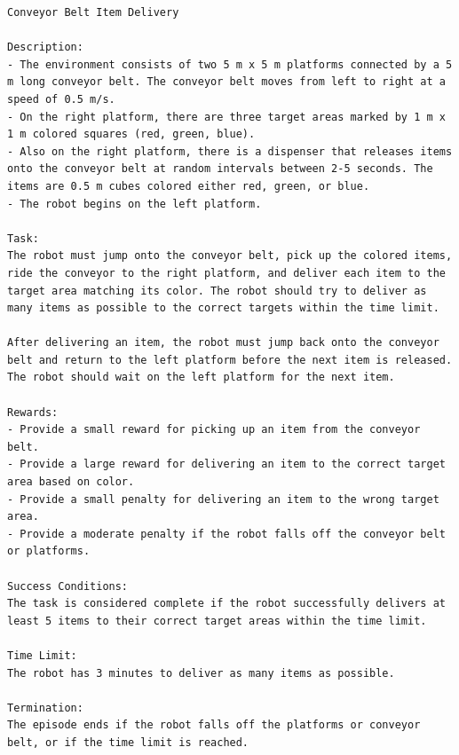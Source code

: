\begin{lstlisting}[language={}]
Conveyor Belt Item Delivery

Description:
- The environment consists of two 5 m x 5 m platforms connected by a 5 m long conveyor belt. The conveyor belt moves from left to right at a speed of 0.5 m/s.
- On the right platform, there are three target areas marked by 1 m x 1 m colored squares (red, green, blue). 
- Also on the right platform, there is a dispenser that releases items onto the conveyor belt at random intervals between 2-5 seconds. The items are 0.5 m cubes colored either red, green, or blue.
- The robot begins on the left platform. 

Task:
The robot must jump onto the conveyor belt, pick up the colored items, ride the conveyor to the right platform, and deliver each item to the target area matching its color. The robot should try to deliver as many items as possible to the correct targets within the time limit.

After delivering an item, the robot must jump back onto the conveyor belt and return to the left platform before the next item is released. The robot should wait on the left platform for the next item.

Rewards:
- Provide a small reward for picking up an item from the conveyor belt.
- Provide a large reward for delivering an item to the correct target area based on color.
- Provide a small penalty for delivering an item to the wrong target area.
- Provide a moderate penalty if the robot falls off the conveyor belt or platforms.

Success Conditions:
The task is considered complete if the robot successfully delivers at least 5 items to their correct target areas within the time limit.

Time Limit:
The robot has 3 minutes to deliver as many items as possible.

Termination:
The episode ends if the robot falls off the platforms or conveyor belt, or if the time limit is reached.
\end{lstlisting}

